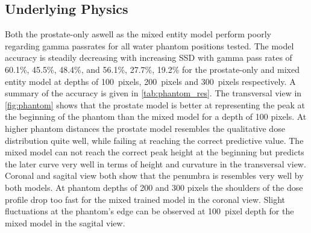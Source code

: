 \subsection{Underlying Physics}

Both the prostate-only aswell as the mixed entity model perform poorly regarding gamma passrates for all water phantom positions tested. 
The model accuracy is steadily decreasing with increasing \acs{SSD} with gamma pass rates of 60.1\%, 45.5\%, 48.4\%, and 56.1\%, 27.7\%, 19.2\% for the prostate-only and mixed entity model at depths of 100~pixels, 200~pixels and 300~pixels respectively. A summary of the accuracy is given in \autoref{tab:phantom_res}. 
The transversal view in \autoref{fig:phantom} shows that the prostate model is better at representing the peak at the beginning of the phantom than the mixed model for a depth of 100 pixels. 
At higher phantom distances the prostate model resembles the qualitative dose distribution quite well, while failing at reaching the correct predictive value. 
The mixed model can not reach the correct peak height at the beginning but predicts the later curve very well in terms of height and curvature in the transversal view. 
Coronal and sagital view both show that the penumbra is resembles very well by both models. 
At phantom depths of 200 and 300 pixels the shoulders of the dose profile drop too fast for the mixed trained model in the coronal view.
Slight fluctuations at the phantom's edge can be observed at 100~pixel depth for the mixed model in the sagital view.
 
